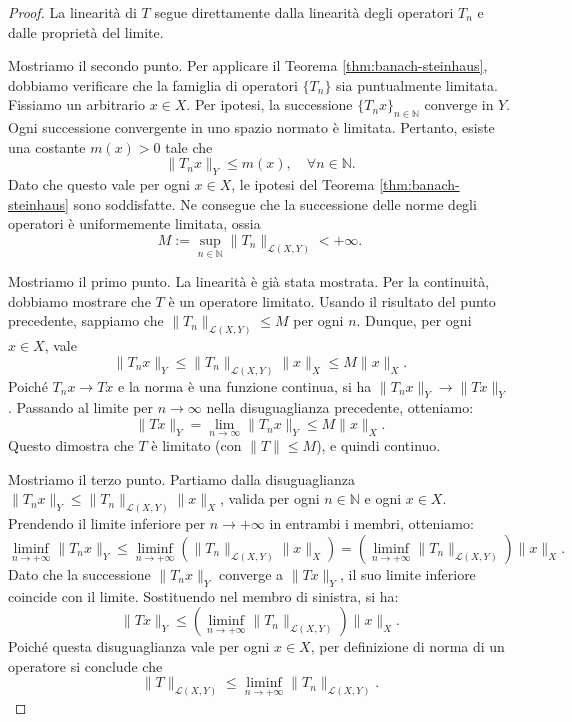 \begin{proof}
  La linearità di \(T\) segue direttamente dalla linearità degli operatori \(T_n\) e dalle proprietà del limite.

  Mostriamo il secondo punto. Per applicare il Teorema \ref{thm:banach-steinhaus}, dobbiamo verificare che la famiglia di operatori \(\{T_n\}\) sia puntualmente limitata. Fissiamo un arbitrario \(x \in X\). Per ipotesi, la successione \(\{T_n x\}_{n \in \mathbb{N}}\) converge in \(Y\). Ogni successione convergente in uno spazio normato è limitata. Pertanto, esiste una costante \(m(x) > 0\) tale che
  \[
    \|T_n x \|_Y \leq m(x), \quad \forall n \in \mathbb N.
  \]
  Dato che questo vale per ogni \(x \in X\), le ipotesi del Teorema \ref{thm:banach-steinhaus} sono soddisfatte. Ne consegue che la successione delle norme degli operatori è uniformemente limitata, ossia
  \[
    M := \sup_{n \in \mathbb N} \|T_n\|_{\mathcal L(X, Y)} < +\infty.
  \]

  Mostriamo il primo punto. La linearità è già stata mostrata. Per la continuità, dobbiamo mostrare che \(T\) è un operatore limitato. Usando il risultato del punto precedente, sappiamo che \(\|T_n\|_{\mathcal L(X, Y)} \le M\) per ogni \(n\). Dunque, per ogni \(x \in X\), vale
  \[
    \|T_n x\|_Y \le \|T_n\|_{\mathcal L(X, Y)} \|x\|_X \le M \|x\|_X.
  \]
  Poiché \(T_n x \to T x\) e la norma è una funzione continua, si ha \(\|T_n x\|_Y \to \|T x\|_Y\). Passando al limite per \(n \to \infty\) nella disuguaglianza precedente, otteniamo:
  \[
    \|T x\|_Y = \lim_{n \to \infty} \|T_n x\|_Y \le M \|x\|_X.
  \]
  Questo dimostra che \(T\) è limitato (con \(\|T\| \le M\)), e quindi continuo.

  Mostriamo il terzo punto. Partiamo dalla disuguaglianza \(\|T_n x\|_Y \le \|T_n\|_{\mathcal L(X, Y)} \|x\|_X\), valida per ogni \(n \in \mathbb{N}\) e ogni \(x \in X\). Prendendo il limite inferiore per \(n \to +\infty\) in entrambi i membri, otteniamo:
  \[
      \liminf_{n \to +\infty} \|T_n x\|_Y \le \liminf_{n \to +\infty} \left( \|T_n\|_{\mathcal L(X, Y)} \|x\|_X \right) = \left(\liminf_{n \to +\infty} \|T_n\|_{\mathcal L(X, Y)}\right) \|x\|_X.
  \]
  Dato che la successione \(\|T_n x\|_Y\) converge a \(\|T x\|_Y\), il suo limite inferiore coincide con il limite. Sostituendo nel membro di sinistra, si ha:
  \[
      \|T x\|_Y \le \left(\liminf_{n \to +\infty} \|T_n\|_{\mathcal L(X, Y)}\right) \|x\|_X.
  \]
  Poiché questa disuguaglianza vale per ogni \(x \in X\), per definizione di norma di un operatore si conclude che
  \[
      \|T\|_{\mathcal L(X, Y)} \le \liminf_{n \to +\infty} \|T_n\|_{\mathcal L(X, Y)}.
  \]
\end{proof}
